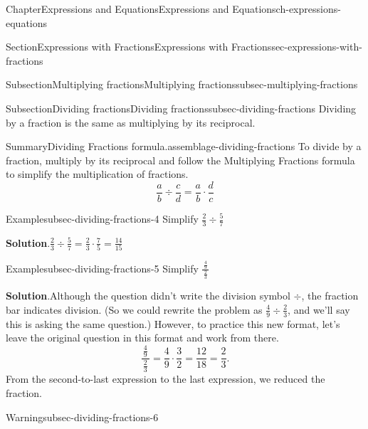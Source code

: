 \documentclass[twoside,11pt,]{book}
\newcommand{\blocktitlefont}{\relax}
\numberwithin{equation}{chapter}
\begin{document}
\begin{chapterptx}{Chapter}{Expressions and Equations}{}{Expressions and Equations}{}{}{ch-expressions-equations}
\begin{sectionptx}{Section}{Expressions with Fractions}{}{Expressions with Fractions}{}{}{sec-expressions-with-fractions}
\begin{subsectionptx}{Subsection}{Multiplying fractions}{}{Multiplying fractions}{}{}{subsec-multiplying-fractions}
\end{subsectionptx}
%
%
\typeout{************************************************}
\typeout{************************************************}
%
\begin{subsectionptx}{Subsection}{Dividing fractions}{}{Dividing fractions}{}{}{subsec-dividing-fractions}
Dividing by a fraction is the same as multiplying by its reciprocal.%
\begin{assemblage}{Summary}{Dividing Fractions formula.}{assemblage-dividing-fractions}%
To divide by a fraction, multiply by its reciprocal and follow the Multiplying Fractions formula to simplify the multiplication of fractions.%
\begin{equation*}
\frac{a}{b} \div \frac{c}{d} = \frac{a}{b} \cdot \frac{d}{c}
\end{equation*}
%
\end{assemblage}
\begin{example}{Example}{}{subsec-dividing-fractions-4}%
Simplify \(\frac{2}{3} \div \frac{5}{7}\)%
\par\smallskip%
\noindent\textbf{\blocktitlefont Solution}.\hypertarget{subsec-dividing-fractions-4-2}{}\quad{}\(\frac{2}{3} \div \frac{5}{7} = \frac{2}{3} \cdot \frac{7}{5} = \frac{14}{15}\)%
\end{example}
\begin{example}{Example}{}{subsec-dividing-fractions-5}%
Simplify \(\frac{\,\frac{4}{9}\,}{\,\frac{2}{3}\,}\)%
\par\smallskip%
\noindent\textbf{\blocktitlefont Solution}.\hypertarget{subsec-dividing-fractions-5-2}{}\quad{}Although the question didn't write the division symbol \(\div\), the fraction bar indicates division. (So we could rewrite the problem as \(\frac{4}{9} \div \frac{2}{3}\), and we'll say this is asking the same question.) However, to practice this new format, let's leave the original question in this format and work from there.%
\begin{equation*}
\frac{\,\frac{4}{9}\,}{\,\frac{2}{3}\,} = \frac{4}{9} \cdot \frac{3}{2} = \frac{12}{18} = \frac{2}{3}.
\end{equation*}
From the second-to-last expression to the last expression, we reduced the fraction.%
\end{example}
\begin{warning}{Warning}{}{subsec-dividing-fractions-6}%

\end{warning}
\end{subsectionptx}
\end{sectionptx}
\end{chapterptx}
\end{document}
